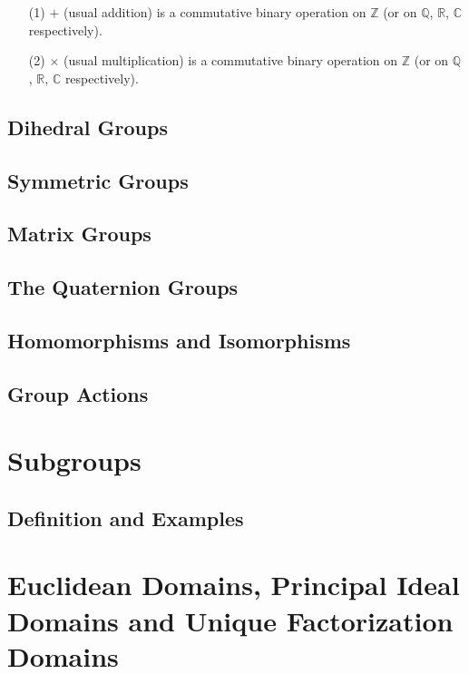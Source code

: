 \documentclass[cn,11pt,chinese]{elegantbook}
\def\real{\mathbb{R}}
\numberwithin{equation}{section}
\begin{document}
\begin{example}
\begin{enumerate}
\item[(1)]$+$ (usual addition) is a commutative binary operation on $\mathbb{Z}$ (or on $\mathbb{Q}$, $\real$, $\mathbb{C}$ respectively).

\item[(2)]$\times$ (usual multiplication) is a commutative binary operation on $\mathbb{Z}$ (or on $\mathbb{Q}$, $\real$, $\mathbb{C}$ respectively).
\end{enumerate}
\end{example}


\section{Dihedral Groups}\label{section00102}



\section{Symmetric Groups}\label{section00103}



\section{Matrix Groups}\label{section00104}



\section{The Quaternion Groups}\label{section00105}



\section{Homomorphisms and Isomorphisms}\label{section00106}



\section{Group Actions}\label{section00107}




\chapter{Subgroups}\label{chapter002}
\section{Definition and Examples}\label{section00201}


\chapter{Euclidean Domains, Principal Ideal Domains and Unique Factorization Domains}\label{chapter008}





% 

\appendix
\end{document}
